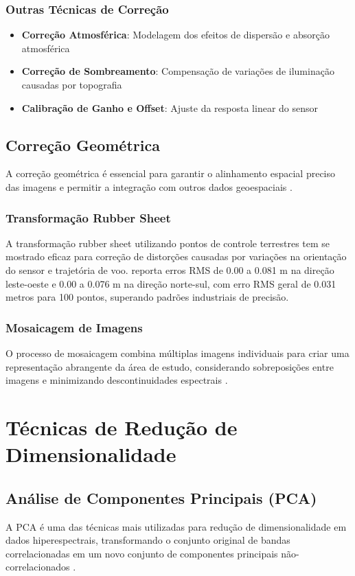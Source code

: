 \subsubsection{Outras Técnicas de Correção}
\begin{itemize}
    \item \textbf{Correção Atmosférica}: Modelagem dos efeitos de dispersão e absorção atmosférica
    \item \textbf{Correção de Sombreamento}: Compensação de variações de iluminação causadas por topografia
    \item \textbf{Calibração de Ganho e Offset}: Ajuste da resposta linear do sensor
\end{itemize}

\subsection{Correção Geométrica}
A correção geométrica é essencial para garantir o alinhamento espacial preciso das imagens e permitir a integração com outros dados geoespaciais \cite{Shin2024}.

\subsubsection{Transformação Rubber Sheet}
A transformação rubber sheet utilizando pontos de controle terrestres tem se mostrado eficaz para correção de distorções causadas por variações na orientação do sensor e trajetória de voo. \cite{Shin2024} reporta erros RMS de 0.00 a 0.081 m na direção leste-oeste e 0.00 a 0.076 m na direção norte-sul, com erro RMS geral de 0.031 metros para 100 pontos, superando padrões industriais de precisão.

\subsubsection{Mosaicagem de Imagens}
O processo de mosaicagem combina múltiplas imagens individuais para criar uma representação abrangente da área de estudo, considerando sobreposições entre imagens e minimizando descontinuidades espectrais \cite{Shin2024}.

\section{Técnicas de Redução de Dimensionalidade}\label{sec:reducao_dimensionalidade}

\subsection{Análise de Componentes Principais (PCA)}
A PCA é uma das técnicas mais utilizadas para redução de dimensionalidade em dados hiperespectrais, transformando o conjunto original de bandas correlacionadas em um novo conjunto de componentes principais não-correlacionados \cite{Lou2024}.

